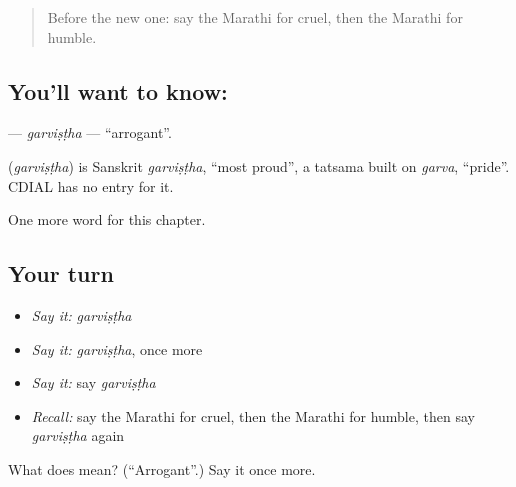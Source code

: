 \label{lesson:MR-C177-garvistha}



\begin{quote}
Before the new one: say the Marathi for cruel, then the Marathi for humble.
\end{quote}

\subsection*{You'll want to know: }
\textbf{} — \emph{garviṣṭha} — \textquotedblleft{}arrogant\textquotedblright{}.

\begin{cousinweb}
\textbf{} (\emph{garviṣṭha}) is Sanskrit \emph{garviṣṭha}, \textquotedblleft{}most proud\textquotedblright{}, a tatsama built on \emph{garva}, \textquotedblleft{}pride\textquotedblright{}. CDIAL has no entry for it.
\end{cousinweb}

\begin{grammarlens}[title={What you've built}]
One more word for this chapter.
\end{grammarlens}

\subsection*{Your turn}
\begin{itemize}
\raggedright
  \item \emph{Say it:} \emph{garviṣṭha}
  \item \emph{Say it:} \emph{garviṣṭha}, once more
  \item \emph{Say it:} say \emph{garviṣṭha}
  \item \emph{Recall:} say the Marathi for cruel, then the Marathi for humble, then say \emph{garviṣṭha} again
\end{itemize}

\begin{tcolorbox}[breakable,colback=teal!4,colframe=teal!35!black,title={Before you move on}]
What does  mean? (\textquotedblleft{}Arrogant\textquotedblright{}.) Say it once more.
\end{tcolorbox}
